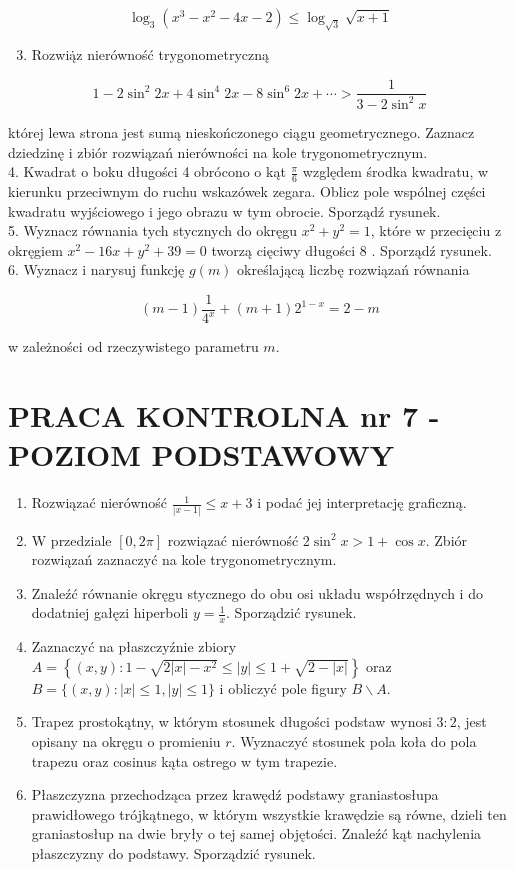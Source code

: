 \documentclass[10pt]{article}
\begin{document}
$$
\log _{3}\left(x^{3}-x^{2}-4 x-2\right) \leqslant \log _{\sqrt{3}} \sqrt{x+1}
$$

\begin{enumerate}
  \setcounter{enumi}{2}
  \item Rozwią̇z nierówność trygonometryczną
\end{enumerate}

$$
1-2 \sin ^{2} 2 x+4 \sin ^{4} 2 x-8 \sin ^{6} 2 x+\cdots>\frac{1}{3-2 \sin ^{2} x}
$$

której lewa strona jest sumą nieskończonego ciągu geometrycznego. Zaznacz dziedzinę i zbiór rozwiązań nierówności na kole trygonometrycznym.\\
4. Kwadrat o boku długości 4 obrócono o kąt $\frac{\pi}{6}$ względem środka kwadratu, w kierunku przeciwnym do ruchu wskazówek zegara. Oblicz pole wspólnej części kwadratu wyjściowego i jego obrazu w tym obrocie. Sporządź rysunek.\\
5. Wyznacz równania tych stycznych do okręgu $x^{2}+y^{2}=1$, które w przecięciu z okręgiem $x^{2}-16 x+y^{2}+39=0$ tworzą cięciwy długości 8 . Sporządź rysunek.\\
6. Wyznacz i narysuj funkcję $g(m)$ określającą liczbę rozwiązań równania

$$
(m-1) \frac{1}{4^{x}}+(m+1) 2^{1-x}=2-m
$$

w zależności od rzeczywistego parametru $m$.

\section*{PRACA KONTROLNA nr 7 - POZIOM PODSTAWOWY}
\begin{enumerate}
  \item Rozwiązać nierówność $\frac{1}{|x-1|} \leqslant x+3$ i podać jej interpretację graficzną.
  \item W przedziale $[0,2 \pi]$ rozwiązać nierówność $2 \sin ^{2} x>1+\cos x$. Zbiór rozwiązań zaznaczyć na kole trygonometrycznym.
  \item Znaleźć równanie okręgu stycznego do obu osi układu współrzędnych i do dodatniej gałęzi hiperboli $y=\frac{1}{x}$. Sporządzić rysunek.
  \item Zaznaczyć na płaszczyźnie zbiory $A=\left\{(x, y): 1-\sqrt{2|x|-x^{2}} \leqslant|y| \leqslant 1+\sqrt{2-|x|}\right\}$ oraz $B=\{(x, y):|x| \leqslant 1,|y| \leqslant 1\}$ i obliczyć pole figury $B \backslash A$.
  \item Trapez prostokątny, w którym stosunek długości podstaw wynosi $3: 2$, jest opisany na okręgu o promieniu $r$. Wyznaczyć stosunek pola koła do pola trapezu oraz cosinus kąta ostrego w tym trapezie.
  \item Płaszczyzna przechodząca przez krawędź podstawy graniastosłupa prawidłowego trójkątnego, w którym wszystkie krawędzie są równe, dzieli ten graniastosłup na dwie bryły o tej samej objętości. Znaleźć kąt nachylenia płaszczyzny do podstawy. Sporządzić rysunek.
\end{enumerate}
\end{document}
